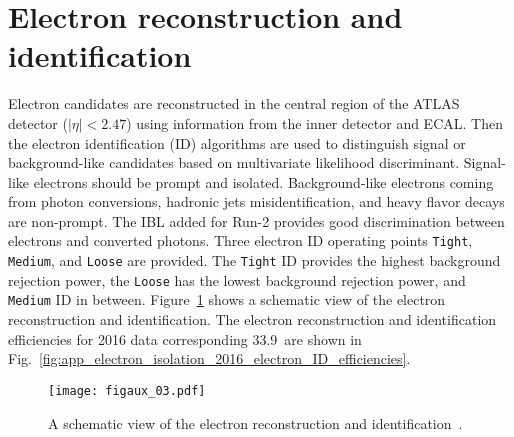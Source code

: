 
\section{Electron reconstruction and identification}
\label{sec:app_electron_reconstruction_and_identification}
Electron candidates are reconstructed in the central region of the ATLAS detector ($|\eta| < 2.47$) using information from the inner detector and ECAL.
Then the electron identification (ID) algorithms are used to distinguish signal or background-like candidates based on multivariate likelihood discriminant.
Signal-like electrons should be prompt and isolated.
Background-like electrons coming from photon conversions, hadronic jets misidentification, and heavy flavor decays are non-prompt.
The IBL added for Run-2 provides good discrimination between electrons and converted photons.
Three electron ID operating points \texttt{Tight}, \texttt{Medium}, and \texttt{Loose} are provided.
The \texttt{Tight} ID provides the highest background rejection power, the \texttt{Loose} has the lowest background rejection power, and \texttt{Medium} ID in between.
Figure~\ref{fig:app_electron_isolation_schematic_view_of_electron_reco_ID} shows a schematic view of the electron reconstruction and identification.
The electron reconstruction and identification efficiencies for 2016 data corresponding 33.9~\ifb are shown in Fig.~\ref{fig:app_electron_isolation_2016_electron_ID_efficiencies}.

\begin{figure}[htbp]
    \begin{center}
        \texttt{[image: figaux\_03.pdf]}
        \caption{A schematic view of the electron reconstruction and identification~\cite{ATLAS:2016iqc}.}
        \label{fig:app_electron_isolation_schematic_view_of_electron_reco_ID}
    \end{center}
\end{figure}

